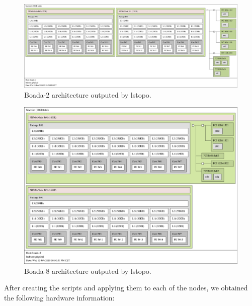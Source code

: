 \documentclass[12]{article}
\begin{document}
\begin{figure}[h]
\centering  \includegraphics[width=.8\linewidth]{images/map-2.png}
  \caption{Boada-2 architecture outputed by lstopo.}
  \label{fig:lstopto2}
\end{figure}

\begin{figure}[h]
\centering
  \includegraphics[width=.8\linewidth]{images/map-8.png}
  \caption{Boada-8 architecture outputed by lstopo.}
  \label{fig:lstopto8}
\end{figure}

After creating the scripts and applying them to each of the nodes, we obtained the following hardware information: 
\end{document}
